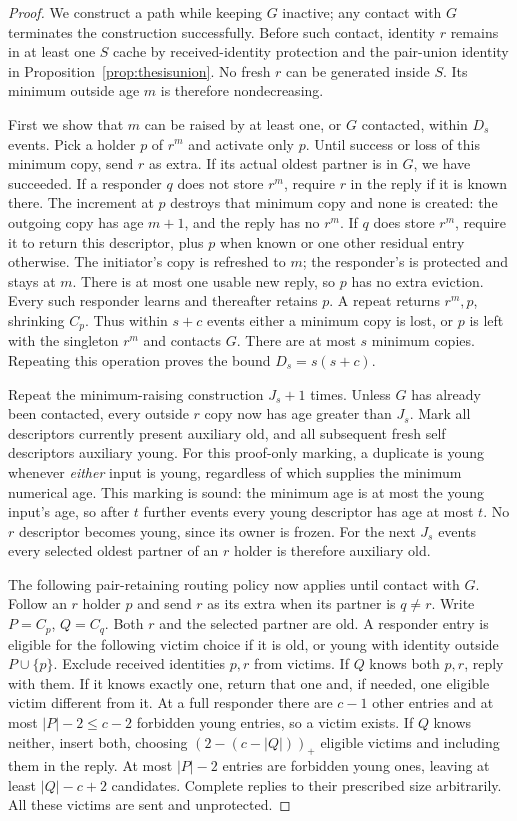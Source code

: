 \documentclass[11pt]{article}
\begin{document}
\begin{proof}
We construct a path while keeping $G$ inactive; any
contact with $G$ terminates the construction successfully.
Before such contact, identity $r$ remains in at least one
$S$ cache by received-identity protection and the pair-union
identity in Proposition~\ref{prop:thesisunion}.
No fresh $r$ can be generated inside $S$.
Its minimum outside age $m$ is therefore nondecreasing.

First we show that $m$ can be raised by at least one,
or $G$ contacted, within $D_s$ events. Pick a holder $p$
of $r^m$ and activate only $p$. Until success or loss of
this minimum copy, send $r$ as extra. If its actual oldest
partner is in $G$, we have succeeded. If a responder $q$
does not store $r^m$, require $r$ in the reply if it is
known there. The increment at $p$ destroys that
minimum copy and none is created: the outgoing copy has
age $m+1$, and the reply has no $r^m$.
If $q$ does store $r^m$, require it to return this
descriptor, plus $p$ when known or one other residual
entry otherwise. The initiator's copy is refreshed to $m$;
the responder's is protected and stays at $m$.
There is at most one usable new reply, so $p$ has no
extra eviction. Every such responder learns and thereafter
retains $p$. A repeat returns $r^m,p$, shrinking $C_p$.
Thus within $s+c$ events either a minimum copy is lost,
or $p$ is left with the singleton $r^m$ and contacts $G$.
There are at most $s$ minimum copies. Repeating this
operation proves the bound $D_s=s(s+c)$.

Repeat the minimum-raising construction $J_s+1$ times.
Unless $G$ has already been contacted, every outside
$r$ copy now has age greater than $J_s$.
Mark all descriptors currently present auxiliary old,
and all subsequent fresh self descriptors auxiliary young.
For this proof-only marking, a duplicate is young whenever
\emph{either} input is young, regardless of which supplies
the minimum numerical age. This marking is sound: the
minimum age is at most the young input's age, so after
$t$ further events every young descriptor has age at most
$t$. No $r$ descriptor becomes young, since its owner is
frozen. For the next $J_s$ events every selected oldest
partner of an $r$ holder is therefore auxiliary old.

The following pair-retaining routing policy now applies until
contact with $G$. Follow an $r$ holder $p$ and send $r$ as its extra
when its partner is $q\ne r$. Write $P=C_p$, $Q=C_q$. Both $r$ and
the selected partner are old. A responder entry is eligible for the
following victim choice if it is old, or young with identity outside
$P\cup\{p\}$. Exclude received identities $p,r$ from victims.
If $Q$ knows both $p,r$, reply with them. If it knows exactly one,
return that one and, if needed, one eligible victim different from
it. At a full responder there are $c-1$ other entries and at most
$|P|-2\le c-2$ forbidden young entries, so a victim exists.
If $Q$ knows neither, insert both, choosing
$(2-(c-|Q|))_+$ eligible victims and including them in the reply.
At most $|P|-2$ entries are forbidden young ones, leaving at least
$|Q|-c+2$ candidates. Complete replies to their prescribed size
arbitrarily. All these victims are sent and unprotected.


\end{proof}
\end{document}
